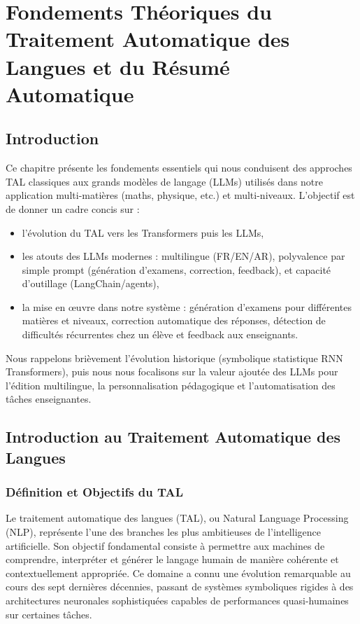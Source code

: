 
\chapter{Fondements Théoriques du Traitement Automatique des Langues et du Résumé Automatique}

\section{Introduction}

Ce chapitre présente les fondements essentiels qui nous conduisent des approches TAL classiques aux grands modèles de langage (LLMs) utilisés dans notre application multi-matières (maths, physique, etc.) et multi-niveaux. L'objectif est de donner un cadre concis sur :
\begin{itemize}
    \item l'évolution du TAL vers les Transformers puis les LLMs,
    \item les atouts des LLMs modernes : multilingue (FR/EN/AR), polyvalence par simple prompt (génération d’examens, correction, feedback), et capacité d'outillage (LangChain/agents),
    \item la mise en œuvre dans notre système : génération d'examens pour différentes matières et niveaux, correction automatique des réponses, détection de difficultés récurrentes chez un élève et feedback aux enseignants.
\end{itemize}

Nous rappelons brièvement l’évolution historique (symbolique \textrightarrow{} statistique \textrightarrow{} RNN \textrightarrow{} Transformers), puis nous nous focalisons sur la valeur ajoutée des LLMs pour l’édition multilingue, la personnalisation pédagogique et l’automatisation des tâches enseignantes.

\section{Introduction au Traitement Automatique des Langues}

\subsection{Définition et Objectifs du TAL}

Le traitement automatique des langues (TAL), ou Natural Language Processing (NLP), représente l'une des branches les plus ambitieuses de l'intelligence artificielle. Son objectif fondamental consiste à permettre aux machines de comprendre, interpréter et générer le langage humain de manière cohérente et contextuellement appropriée. Ce domaine a connu une évolution remarquable au cours des sept dernières décennies, passant de systèmes symboliques rigides à des architectures neuronales sophistiquées capables de performances quasi-humaines sur certaines tâches.

